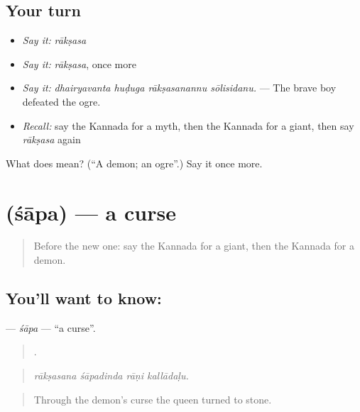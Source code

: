 \subsection*{Your turn}
\begin{itemize}
\raggedright
  \item \emph{Say it:} \emph{rākṣasa}
  \item \emph{Say it:} \emph{rākṣasa}, once more
  \item \emph{Say it:} \emph{dhairyavanta huḍuga rākṣasanannu sōlisidanu.} — The brave boy defeated the ogre.
  \item \emph{Recall:} say the Kannada for a myth, then the Kannada for a giant, then say \emph{rākṣasa} again
\end{itemize}

\begin{tcolorbox}[breakable,colback=teal!4,colframe=teal!35!black,title={Before you move on}]
What does  mean? (\textquotedblleft{}A demon; an ogre\textquotedblright{}.) Say it once more.
\end{tcolorbox}
\section[\texorpdfstring{\kn{ಶಾಪ} (śāpa)}{ಶಾಪ (śāpa)}]{ (śāpa) — a curse}

\label{lesson:KA-C340-sapa}



\begin{quote}
Before the new one: say the Kannada for a giant, then the Kannada for a demon.
\end{quote}

\subsection*{You'll want to know: }
\textbf{} — \emph{śāpa} — \textquotedblleft{}a curse\textquotedblright{}.

\begin{quote}
   .
\end{quote}

\begin{quote}
\emph{rākṣasana śāpadinda rāṇi kallādaḷu.}
\end{quote}

\begin{quote}
Through the demon's curse the queen turned to stone.
\end{quote}

